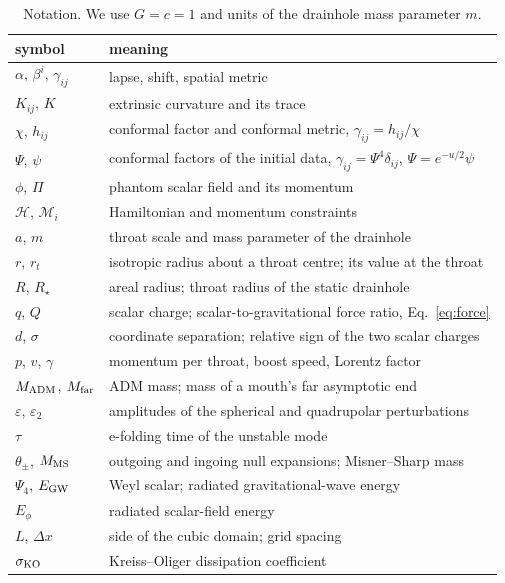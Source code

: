 \documentclass[twocolumn,floatfix,aps,prd,superscriptaddress,nofootinbib,showkeys]{revtex4-2}
\begin{document}
\begin{table}[t]
\caption{Notation. We use $G=c=1$ and units of the drainhole mass parameter $m$.}
\label{tab:notation}
\scriptsize
\begin{ruledtabular}
\begin{tabular}{lp{}}
symbol & meaning \\
\hline
$\alpha$, $\beta^i$, $\gamma_{ij}$ & lapse, shift, spatial metric \\
$K_{ij}$, $K$ & extrinsic curvature and its trace \\
$\chi$, $h_{ij}$ & conformal factor and conformal metric, $\gamma_{ij}=h_{ij}/\chi$ \\
$\Psi$, $\psi$ & conformal factors of the initial data, $\gamma_{ij}=\Psi^4\delta_{ij}$, $\Psi=e^{-u/2}\psi$ \\
$\phi$, $\Pi$ & phantom scalar field and its momentum \\
$\mathcal H$, $\mathcal M_i$ & Hamiltonian and momentum constraints \\
$a$, $m$ & throat scale and mass parameter of the drainhole \\
$r$, $r_t$ & isotropic radius about a throat centre; its value at the throat \\
$R$, $R_\star$ & areal radius; throat radius of the static drainhole \\
$q$, $Q$ & scalar charge; scalar-to-gravitational force ratio, Eq.~\eqref{eq:force} \\
$d$, $\sigma$ & coordinate separation; relative sign of the two scalar charges \\
$p$, $v$, $\gamma$ & momentum per throat, boost speed, Lorentz factor \\
$M_{\rm ADM}$, $M_{\rm far}$ & ADM mass; mass of a mouth's far asymptotic end \\
$\varepsilon$, $\varepsilon_2$ & amplitudes of the spherical and quadrupolar perturbations \\
$\tau$ & e-folding time of the unstable mode \\
$\theta_\pm$, $M_{\rm MS}$ & outgoing and ingoing null expansions; Misner--Sharp mass \\
$\Psi_4$, $E_{\rm GW}$ & Weyl scalar; radiated gravitational-wave energy \\
$E_\phi$ & radiated scalar-field energy \\
$L$, $\Delta x$ & side of the cubic domain; grid spacing \\
$\sigma_{\rm KO}$ & Kreiss--Oliger dissipation coefficient \\
\end{tabular}
\end{ruledtabular}
\end{table}
\end{document}

